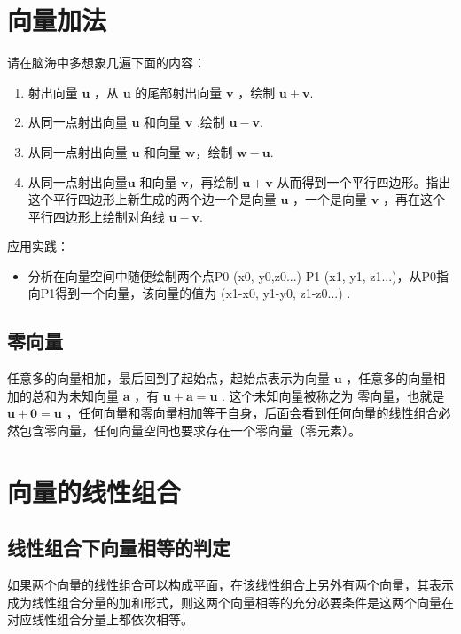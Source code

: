 \documentclass[12pt,oneside]{book}
\begin{document}
\section{向量加法}
请在脑海中多想象几遍下面的内容：

\begin{enumerate}
\item 射出向量 $\boldsymbol{u}$ ，从 $\boldsymbol{u}$ 的尾部射出向量  $\boldsymbol{v}$  ，绘制  $\boldsymbol{u} +\boldsymbol{v} $.
\item 从同一点射出向量 $\boldsymbol{u}$ 和向量 $\boldsymbol{v}$ ,绘制  $\boldsymbol{u} - \boldsymbol{v} $.
\item 从同一点射出向量 $\boldsymbol{u}$ 和向量 $\boldsymbol{w}$，绘制 $\boldsymbol{w} - \boldsymbol{u} $.
\item 从同一点射出向量$\boldsymbol{u}$ 和向量 $\boldsymbol{v}$，再绘制 $\boldsymbol{u} +\boldsymbol{v} $ 从而得到一个平行四边形。指出这个平行四边形上新生成的两个边一个是向量 $\boldsymbol{u}$ ，一个是向量 $\boldsymbol{v}$ ，再在这个平行四边形上绘制对角线 $\boldsymbol{u} -\boldsymbol{v} $.
\end{enumerate}

应用实践：
\begin{itemize}
\item 分析在向量空间中随便绘制两个点P0 (x0, y0,z0...) P1 (x1, y1, z1...)，从P0指向P1得到一个向量，该向量的值为 (x1-x0, y1-y0, z1-z0...) .
\end{itemize}

\subsection{零向量}
任意多的向量相加，最后回到了起始点，起始点表示为向量 $\boldsymbol{u}$ ，任意多的向量相加的总和为未知向量 $\boldsymbol{a}$ ，有 $\boldsymbol{u} + \boldsymbol{a} = \boldsymbol{u}$ . 这个未知向量被称之为 零向量，也就是  $\boldsymbol{u} + \boldsymbol{0} = \boldsymbol{u}$ ，任何向量和零向量相加等于自身，后面会看到任何向量的线性组合必然包含零向量，任何向量空间也要求存在一个零向量（零元素）。

\section{向量的线性组合}

\subsection{线性组合下向量相等的判定}
如果两个向量的线性组合可以构成平面，在该线性组合上另外有两个向量，其表示成为线性组合分量的加和形式，则这两个向量相等的充分必要条件是这两个向量在对应线性组合分量上都依次相等。
\end{document}
